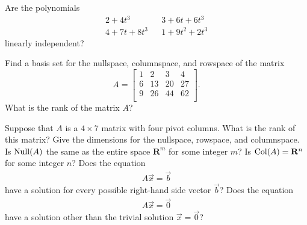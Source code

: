 \documentclass[12pt]{exam}
\newcommand{\real}{\mathbf{R}}
\begin{document}
\begin{questions}
\begin{parts}
\part
$\left\lbrace \left[
\begin{array}{c}
1 \\ 0 
\end{array}
\right], 
\left[
\begin{array}{c}
1 \\ -2 
\end{array}
\right],
\left[
\begin{array}{c}
0 \\ 11 
\end{array}
\right]
\right\rbrace$

\part
$\left\lbrace \left[
\begin{array}{c}
15 \\ 5 
\end{array}
\right], 
\left[
\begin{array}{c}
-6 \\ -2 
\end{array}
\right]
\right\rbrace$
\end{parts}

\question[10]
Are the polynomials
\begin{align*}
	2 + 4t^3 && 3 + 6t + 6t^3 \\
    4 + 7t + 8t^3 && 1 + 9t^2 + 2t^3
\end{align*}
linearly independent? 

\question[18]
Find a basis set for the nullspace, columnspace, and rowspace of the matrix
\begin{equation*}
	A = \left[ \begin{array}{ccccc}
		1 & 2 & 3 & 4 \\
		6 & 13 & 20 & 27 \\
		9 & 26 & 44 & 62 \\
	\end{array} \right].
\end{equation*}
What is the rank of the matrix $A$?

\clearpage

\question[15]
Suppose that $A$ is a $4 \times 7$ matrix with four pivot columns.  What is the rank of this matrix? Give the dimensions for the nullspace, rowspace, and columnspace.  Is $\textnormal{Null}(A)$ the same as the entire space $\real^m$ for some integer $m$? Is $\textnormal{Col}(A) = \real^n$ for some integer $n$?  Does the equation
\begin{align*}
A \vec{x} = \vec{b}
\end{align*}
have a solution for every possible right-hand side vector $\vec{b}$?  Does the equation
\begin{align*}
A \vec{x} = \vec{0}
\end{align*}
have a solution other than the trivial solution $\vec{x} = \vec{0}$?


\end{questions}
\end{document}
